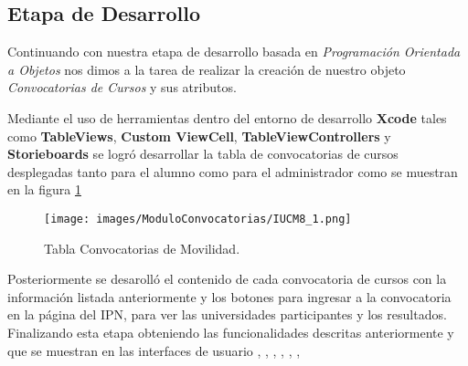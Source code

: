  
 
 \subsection{Etapa de Desarrollo}
 Continuando con nuestra etapa de desarrollo basada en \textit{Programación Orientada a Objetos} nos dimos a la tarea de realizar la creación de nuestro objeto \textit{Convocatorias de Cursos} y sus atributos.
 
 Mediante el uso de herramientas dentro del entorno de desarrollo \textbf{Xcode} tales como \textbf{TableViews}, \textbf{Custom ViewCell}, \textbf{TableViewControllers} y \textbf{Storieboards} se logró desarrollar la tabla de convocatorias de cursos desplegadas tanto para el alumno como para el administrador como se muestran en la figura \ref{ConvMov}
 
 \begin{figure}[h!]
 	\begin{center}
 		\texttt{[image: images/ModuloConvocatorias/IUCM8\_1.png]}
 		\caption{Tabla Convocatorias de Movilidad.}
 		\label{ConvMov}
 	\end{center}
 \end{figure}
 
 Posteriormente se desarolló el contenido de cada convocatoria de cursos con la información listada anteriormente y los botones para ingresar a la convocatoria en la página del IPN, para ver las universidades participantes y los resultados. \\
 
 Finalizando esta etapa obteniendo las funcionalidades descritas anteriormente y que se muestran en las interfaces de usuario , , , , , ,  \\